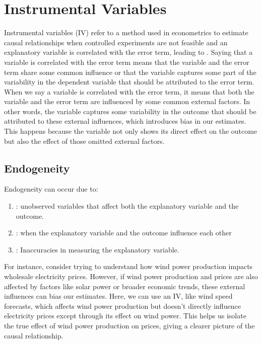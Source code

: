 \documentclass[letterpaper,10pt,english]{jupyterBook}
\begin{document}
\chapter{Instrumental Variables}
\label{\detokenize{notebooks/instrumental_variables:instrumental-variables}}\label{\detokenize{notebooks/instrumental_variables::doc}}
\sphinxAtStartPar
Instrumental variables (IV) refer to a method used in econometrics to estimate causal relationships when controlled experiments are not feasible and an explanatory variable is correlated with the error term, leading to . Saying that a variable is correlated with the error term means that the variable and the error term share some common influence or that the variable captures some part of the variability in the dependent variable that should be attributed to the error term. When we say a variable is correlated with the error term, it means that both the variable and the error term are influenced by some common external factors. In other words, the variable captures some variability in the outcome that should be attributed to these external influences, which introduces bias in our estimates. This happens because the variable not only shows its direct effect on the outcome but also the effect of those omitted external factors.


\section{Endogeneity}
\label{\detokenize{notebooks/instrumental_variables:endogeneity}}
\sphinxAtStartPar
Endogeneity can occur due to:
\begin{enumerate}
%
\item {} 
\sphinxAtStartPar
{}: unobserved variables that affect both the explanatory variable and the outcome.

\item {} 
\sphinxAtStartPar
{}: when the explanatory variable and the outcome influence each other

\item {} 
\sphinxAtStartPar
{}: Inaccuracies in measuring the explanatory variable.

\end{enumerate}

\sphinxAtStartPar
For instance, consider trying to understand how wind power production impacts wholesale electricity prices. However, if wind power production and prices are also affected by factors like solar power or broader economic trends, these external influences can bias our estimates. Here, we can use an IV, like wind speed forecasts, which affects wind power production but doesn’t directly influence electricity prices except through its effect on wind power. This helps us isolate the true effect of wind power production on prices, giving a clearer picture of the causal relationship.
\end{document}
